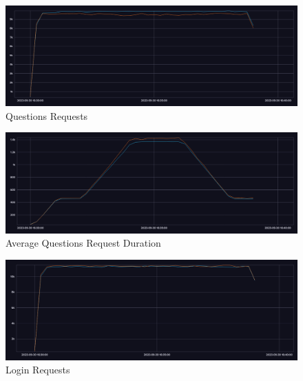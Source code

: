 \documentclass[BIF,Bachelor,nenglish]{twbook}%
\begin{document}
\begin{figure} [H]
 \begin{center}
    \includegraphics[width=1\linewidth]{img/Questions_Requests_15s_Compare.png}
 \end{center}
 \caption{Questions Requests}
 \label{questionsRequests}
\end{figure}


\begin{figure} [H]
 \begin{center}
    \includegraphics[width=1\linewidth]{img/Questions_Duration_15s_Compare.png}
 \end{center}
 \caption{Average Questions Request Duration}
 \label{questionsDuration}
\end{figure}


\begin{figure} [H]
 \begin{center}
    \includegraphics[width=1\linewidth]{img/Login_Requests_15s_Compare.png}
 \end{center}
 \caption{Login Requests}
 \label{loginRequests}
\end{figure}
\end{document}
